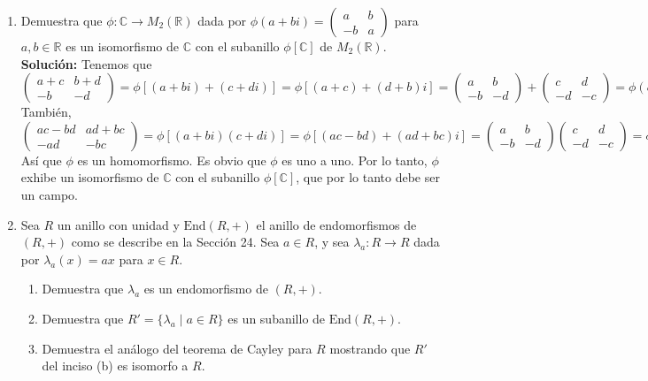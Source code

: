 \begin{enumerate}
\item Demuestra que $\phi : \mathbb{C} \rightarrow M_2(\mathbb{R})$ dada por $\phi(a + bi) = \begin{pmatrix} a & b \\ -b & a \end{pmatrix}$ para $a, b \in \mathbb{R}$ es un isomorfismo de $\mathbb{C}$ con el subanillo $\phi[\mathbb{C}]$ de $M_2(\mathbb{R})$.
\textbf{Solución:}
Tenemos que
    \[
    \begin{pmatrix} a+c & b+d \\ -b & -d \end{pmatrix} = \phi\left[(a + bi) + (c + di)\right] = \phi\left[(a + c) + (d + b)i\right] =
    \begin{pmatrix} a & b \\ -b & -d \end{pmatrix} + \begin{pmatrix} c & d \\ -d & -c \end{pmatrix} = \phi(a + bi) + \phi(c + di).
    \]
    También,
    \[
    \begin{pmatrix} ac - bd & ad + bc \\ -ad & -bc \end{pmatrix} = \phi\left[(a + bi)(c + di)\right] = \phi\left[(ac - bd) + (ad + bc)i\right] =
    \begin{pmatrix} a & b \\ -b & -d \end{pmatrix} \begin{pmatrix} c & d \\ -d & -c \end{pmatrix} = \phi(a + bi)\phi(c + di).
    \]
    Así que $\phi$ es un homomorfismo. Es obvio que $\phi$ es uno a uno. Por lo tanto, $\phi$ exhibe un isomorfismo de $\mathbb{C}$ con el subanillo $\phi[\mathbb{C}]$, que por lo tanto debe ser un campo.

\item Sea $R$ un anillo con unidad y $\text{End}(R, +)$ el anillo de endomorfismos de $(R, +)$ como se describe en la Sección 24. Sea $a \in R$, y sea $\lambda_a : R \rightarrow R$ dada por $\lambda_a(x) = ax$ para $x \in R$.
        \begin{enumerate}
            \item Demuestra que $\lambda_a$ es un endomorfismo de $(R, +)$.
            \item Demuestra que $R' = \{\lambda_a \mid a \in R\}$ es un subanillo de $\text{End}(R, +)$.
            \item Demuestra el análogo del teorema de Cayley para $R$ mostrando que $R'$ del inciso (b) es isomorfo a $R$.
        \end{enumerate}
        

\end{enumerate}
